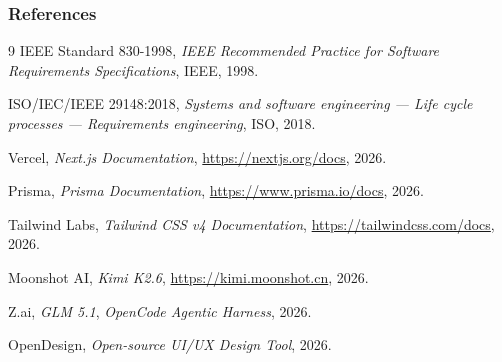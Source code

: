 \documentclass[aspectratio=169,professionalfonts,10pt]{beamer}
\begin{document}
\begin{frame}
    \frametitle{References}
    \small
    \begin{thebibliography}{9}
        \scriptsize
         IEEE Standard 830-1998, \textit{IEEE Recommended Practice for Software Requirements Specifications}, IEEE, 1998.

         ISO/IEC/IEEE 29148:2018, \textit{Systems and software engineering --- Life cycle processes --- Requirements engineering}, ISO, 2018.

         Vercel, \textit{Next.js Documentation}, \url{https://nextjs.org/docs}, 2026.

         Prisma, \textit{Prisma Documentation}, \url{https://www.prisma.io/docs}, 2026.

         Tailwind Labs, \textit{Tailwind CSS v4 Documentation}, \url{https://tailwindcss.com/docs}, 2026.

         Moonshot AI, \textit{Kimi K2.6}, \url{https://kimi.moonshot.cn}, 2026.

         Z.ai, \textit{GLM 5.1}, \textit{OpenCode Agentic Harness}, 2026.

         OpenDesign, \textit{Open-source UI/UX Design Tool}, 2026.
    \end{thebibliography}
\end{frame}

\begin{frame}[plain]
    \titlepage
\end{frame}
\end{document}
